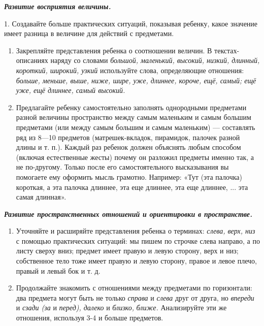 \documentclass[a5paper]{book}
\renewcommand{\emph}[1]{\textit{#1}}
\begin{document}
\emph{\textbf{Развитие восприятия величины.}}

1. Создавайте больше практических ситуаций, показывая ребенку, какое
значение имеет разница в величине для действий с предметами.


\begin{enumerate}
\def\labelenumi{\arabic{enumi}.}
\setcounter{enumi}{1}
\item
  
  Закрепляйте представления ребенка о соотношении величин. В
  текстах-описаниях наряду со словами \emph{большой, маленький, высокий,
  низкий, длинный, короткий, широкий, узкий} используйте слова,
  определяющие отношения: \emph{больше, меньше, выше, ниже, шире, уже,
  длиннее, короче, ещё, самый; ещё уже, ещё длиннее, самый высокий.}
  
\item
  
  Предлагайте ребенку самостоятельно заполнять однородными предметами
  разной величины пространство между самым маленьким и самым большим
  предметами (или между самым большим и самым маленьким) --- составлять
  ряд из 8---10 предметов (матрешек-вкладок, пирамидок, палочек разной
  длины и т. п.). Каждый раз ребенок должен объяснять любым способом
  (включая естественные жесты) почему он разложил предметы именно так, а
  не по-другому. Только после его самостоятельного высказывания вы
  помогаете ему оформить мысль грамотно. Например: «Тут (эта палочка)
  короткая, а эта палочка длиннее, эта еще длиннее, эта еще длиннее, ...
  эта самая длинная».
  
\end{enumerate}


\emph{\textbf{Развитие пространственных отношений и ориентировки в
пространстве.}}


\begin{enumerate}
\def\labelenumi{\arabic{enumi}.}
\item
  
  Уточняйте и расширяйте представления ребенка о терминах: \emph{слева,
  верх, низ} с помощью практических ситуаций: мы пишем по строчке слева
  направо, а по листу сверху вниз; предмет имеет правую и левую сторону,
  верх и низ; собственное тело тоже имеет правую и левую сторону, правое
  и левое плечо, правый и левый бок и т. д.
  
\item
  
  Продолжайте знакомить с отношениями между предметами по горизонтали:
  два предмета могут быть не только \emph{справа} и \emph{слева} друг от
  друга, но \emph{впереди} и \emph{сзади (за} и \emph{перед), далеко} и
  \emph{близко,} \emph{ближе.} Анализируйте эти же отношения, используя
  3-4 и больше предметов.
  
\end{enumerate}
\end{document}
